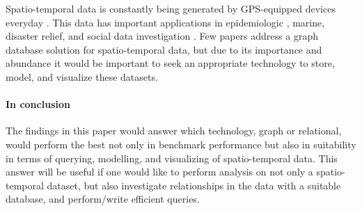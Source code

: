 Spatio-temporal data is constantly being generated by GPS-equipped devices everyday \cite{twitterdata}\cite{clost}. This data has important applications in epidemiologic \cite{spatiotemporal-epidemiology}, marine, disaster relief, and social data investigation \cite{rao2012spatiotemporal}. Few papers address a graph database solution for spatio-temporal data, but due to its importance and abundance it would be important to seek an appropriate technology to store, model, and visualize these datasets.

\paragraph{In conclusion} The findings in this paper would answer which technology, graph or relational, would perform the best not only in benchmark performance but also in suitability in terms of querying, modelling, and visualizing of spatio-temporal data. This answer will be useful if one would like to perform analysis on not only a spatio-temporal dataset, but also investigate relationships in the data with a suitable database, and perform/write efficient queries.